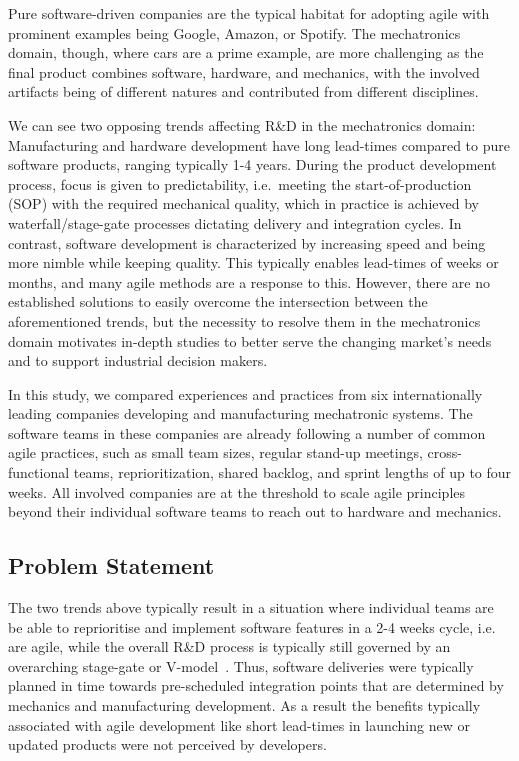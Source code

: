 \documentclass[10pt,a4paper]{IEEEtran} %
\begin{document}
Pure software-driven companies are the typical habitat for adopting agile
with prominent examples being Google, Amazon, or Spotify. The mechatronics
domain, though, where cars are a prime example, are more challenging as
the final product combines software, hardware, and mechanics, with the
involved artifacts being of different natures and contributed from different
disciplines.

We can see two opposing trends affecting R\&D in the mechatronics domain:
Manufacturing and hardware development have long lead-times compared to pure
software products, ranging typically 1-4 years. During the product development process, focus is given to predictability, i.e.~meeting the start-of-production (SOP) with the required mechanical quality, which in practice is achieved by waterfall/stage-gate processes dictating delivery and integration cycles.
In contrast, software development is characterized by increasing speed and being more nimble while keeping quality. This typically enables lead-times of weeks or months, and many agile methods are a response to this. However, there are no established solutions to easily overcome the intersection between the aforementioned trends, but the necessity to resolve them in the mechatronics domain motivates in-depth studies to better serve the changing market's needs and to support industrial decision makers.

In this study, we compared experiences and practices from six internationally
leading companies developing and manufacturing mechatronic systems. The software teams in these companies are already following a number of common agile practices, such as small team sizes, regular stand-up meetings,
cross-functional teams, reprioritization, shared backlog, and sprint lengths of up to four weeks. All involved companies are at the threshold to scale agile principles
beyond their individual software teams to reach out to hardware and mechanics.

\subsection{Problem Statement}
\label{sec:problem}
The two trends above typically result in a situation where individual teams are be able to reprioritise and implement software features in a 2-4 weeks cycle, i.e. are agile, while the overall R\&D process is typically still governed by an overarching stage-gate or V-model~\cite{eklund_applying_2012}. Thus, software deliveries were typically planned in time towards pre-scheduled integration points that are determined by mechanics and manufacturing development. As a result the  benefits typically associated with agile development like short lead-times in launching new or updated products were not perceived by developers.
 
\end{document}
